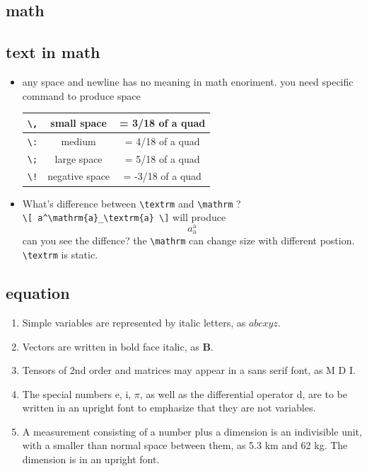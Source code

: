 \documentclass[a4paper,12pt,twoside]{book}
\begin{document}
\begin{CJK*}{UTF8}{song}
\section{math}
		\subsection{text in math}
			\begin{itemize}
			\item any space and newline has no meaning in math enoriment. you need specific command to produce space \\
				\begin{tabular}{|c|c|c|}
				\hline \verb=\,= & small space & = 3/18 of a quad \\
				\hline \verb=\:= & medium  & = 4/18 of a quad \\
				\hline \verb=\;= & large space  & = 5/18 of a quad\\
				\hline \verb=\!= & negative space  & = -3/18 of a quad\\
				\hline
				\end{tabular}
			\item What's difference between \verb=\textrm= and \verb=\mathrm= ? \\
			\verb=\[ a^\mathrm{a}_\textrm{a} \]=  will produce \[ a^\mathrm{a}_\textrm{a} \]
			can you see the diffence? the \verb=\mathrm= can change size with different postion. \verb=\textrm= is static.
			\end{itemize}
		
		\subsection{equation}
		\begin{enumerate}
		\item Simple variables are represented by italic letters, as $a b c x y z$.
		\item Vectors are written in bold face italic, as $\boldsymbol{B}$.
		\item Tensors of 2nd order and matrices may appear in a sans serif font, as
		M D I.
		\item The special numbers e, i, $\pi$, as well as the differential operator d, are to be
		written in an upright font to emphasize that they are not variables.
		\item A measurement consisting of a number plus a dimension is an indivisible
		unit, with a smaller than normal space between them, as 5.3 km and 62 kg.
		The dimension is in an upright font.
		\end{enumerate} \par


\end{CJK*}
\end{document}
